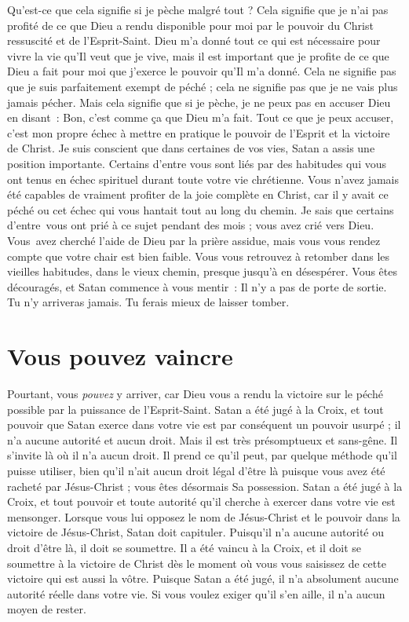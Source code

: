Qu'est-ce que cela signifie si je pèche malgré tout ?
 Cela signifie que je n'ai pas profité de ce que Dieu a rendu disponible
 pour moi par le pouvoir du Christ ressuscité et de l'Esprit-Saint.
 Dieu m'a donné tout ce qui est nécessaire pour vivre la vie
 qu'Il veut que je vive, mais il est important que je profite
 de ce que Dieu a fait pour moi \ocadr que j'exerce le pouvoir
 qu'Il m'a donné.
 Cela ne signifie pas que je suis parfaitement exempt de péché ;
 cela ne signifie pas que je ne vais plus jamais pécher.
 Mais cela signifie que si je pèche, je ne peux pas en accuser Dieu
 en disant~:
 \Og Bon, c'est comme ça que Dieu m'a fait. \Fg{}
 Tout ce que je peux accuser, c'est mon propre échec à mettre en pratique
 le pouvoir de l'Esprit et la victoire de Christ.
 Je suis conscient que dans certaines de vos vies,
 Satan a assis une position importante.
 Certains d'entre vous sont liés par des habitudes qui vous ont tenus
 en échec spirituel durant toute votre vie chrétienne.
 Vous n'avez jamais été capables de vraiment profiter de la joie complète
 en Christ, car il y avait ce péché ou cet échec qui vous hantait
 tout au long du chemin. Je sais que certains d'entre~vous ont prié
 à ce sujet pendant des mois ; vous avez crié vers Dieu.
 Vous~avez cherché l'aide de Dieu par la prière assidue,
 mais vous vous rendez compte que votre chair est bien faible.
 Vous vous retrouvez à retomber dans les vieilles habitudes,
 dans le vieux chemin, presque jusqu'à en désespérer.
 Vous êtes découragés, et Satan commence à vous mentir~:
 \Og Il n'y a pas de porte de sortie. Tu n'y arriveras jamais.
 Tu ferais mieux de laisser tomber. \Fg{}
 \nowidow[4]


\section{Vous pouvez vaincre}

Pourtant, vous \emph{pouvez} y arriver, car Dieu vous a rendu la victoire
 sur le péché possible par la puissance de l'Esprit-Saint.
 Satan a été jugé à la Croix, et tout pouvoir que Satan exerce
 dans votre vie est par conséquent un pouvoir usurpé ;
 il n'a aucune autorité et aucun droit.
 Mais il est très présomptueux et sans-gêne. Il s'invite là où il n'a aucun
 droit. Il prend ce qu'il peut, par quelque méthode qu'il puisse utiliser,
 bien qu'il n'ait aucun droit légal d'être là puisque vous avez été racheté
 par Jésus-Christ ; vous êtes désormais Sa possession.
 Satan a été jugé à la Croix, et tout pouvoir et toute autorité qu'il cherche
 à exercer dans votre vie est mensonger.
 Lorsque vous lui opposez le nom de Jésus-Christ et le pouvoir
 dans la victoire de Jésus-Christ, Satan doit capituler.
 Puisqu'il n'a aucune autorité ou droit d'être là, il doit se soumettre.
 Il a été vaincu à la Croix, et il doit se soumettre à la victoire de Christ
 dès le moment où vous vous saisissez de cette victoire qui est aussi la vôtre.
 Puisque Satan a été jugé, il n'a absolument aucune autorité réelle
 dans votre vie. Si vous voulez exiger qu'il s'en aille,
 il n'a aucun moyen de rester.


